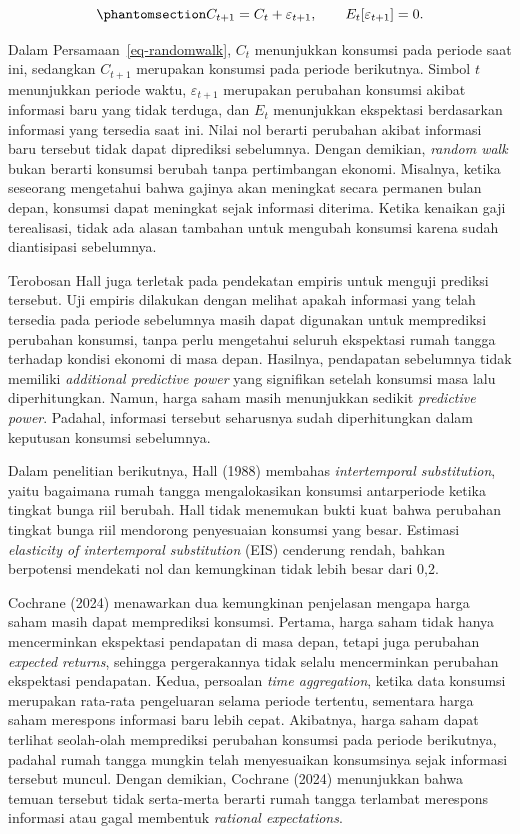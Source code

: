 \documentclass[
  manuscript=article,
  layout=brief,
  year=2026,
  volume=1,
]{den}
\begin{document}
\begin{equation}\protect\phantomsection\label{eq-randomwalk}{
C_{t+1}=C_t+\varepsilon_{t+1}, \qquad E_t[\varepsilon_{t+1}]=0.
}\end{equation}

Dalam Persamaan~\ref{eq-randomwalk}, \(C_t\) menunjukkan konsumsi pada
periode saat ini, sedangkan \(C_{t+1}\) merupakan konsumsi pada periode
berikutnya. Simbol \(t\) menunjukkan periode waktu,
\(\varepsilon_{t+1}\) merupakan perubahan konsumsi akibat informasi baru
yang tidak terduga, dan \(E_t\) menunjukkan ekspektasi berdasarkan
informasi yang tersedia saat ini. Nilai nol berarti perubahan akibat
informasi baru tersebut tidak dapat diprediksi sebelumnya. Dengan
demikian, \emph{random walk} bukan berarti konsumsi berubah tanpa
pertimbangan ekonomi. Misalnya, ketika seseorang mengetahui bahwa
gajinya akan meningkat secara permanen bulan depan, konsumsi dapat
meningkat sejak informasi diterima. Ketika kenaikan gaji terealisasi,
tidak ada alasan tambahan untuk mengubah konsumsi karena sudah
diantisipasi sebelumnya.

Terobosan Hall juga terletak pada pendekatan empiris untuk menguji
prediksi tersebut. Uji empiris dilakukan dengan melihat apakah informasi
yang telah tersedia pada periode sebelumnya masih dapat digunakan untuk
memprediksi perubahan konsumsi, tanpa perlu mengetahui seluruh
ekspektasi rumah tangga terhadap kondisi ekonomi di masa depan.
Hasilnya, pendapatan sebelumnya tidak memiliki \emph{additional
predictive power} yang signifikan setelah konsumsi masa lalu
diperhitungkan. Namun, harga saham masih menunjukkan sedikit
\emph{predictive power}. Padahal, informasi tersebut seharusnya sudah
diperhitungkan dalam keputusan konsumsi sebelumnya.

Dalam penelitian berikutnya, Hall (1988) membahas \emph{intertemporal
substitution}, yaitu bagaimana rumah tangga mengalokasikan konsumsi
antarperiode ketika tingkat bunga riil berubah. Hall tidak menemukan
bukti kuat bahwa perubahan tingkat bunga riil mendorong penyesuaian
konsumsi yang besar. Estimasi \emph{elasticity of intertemporal
substitution} (EIS) cenderung rendah, bahkan berpotensi mendekati nol
dan kemungkinan tidak lebih besar dari 0,2.

Cochrane (2024) menawarkan dua kemungkinan penjelasan mengapa harga
saham masih dapat memprediksi konsumsi. Pertama, harga saham tidak hanya
mencerminkan ekspektasi pendapatan di masa depan, tetapi juga perubahan
\emph{expected returns}, sehingga pergerakannya tidak selalu
mencerminkan perubahan ekspektasi pendapatan. Kedua, persoalan
\emph{time aggregation}, ketika data konsumsi merupakan rata-rata
pengeluaran selama periode tertentu, sementara harga saham merespons
informasi baru lebih cepat. Akibatnya, harga saham dapat terlihat
seolah-olah memprediksi perubahan konsumsi pada periode berikutnya,
padahal rumah tangga mungkin telah menyesuaikan konsumsinya sejak
informasi tersebut muncul. Dengan demikian, Cochrane (2024) menunjukkan
bahwa temuan tersebut tidak serta-merta berarti rumah tangga terlambat
merespons informasi atau gagal membentuk \emph{rational expectations}.
\end{document}
